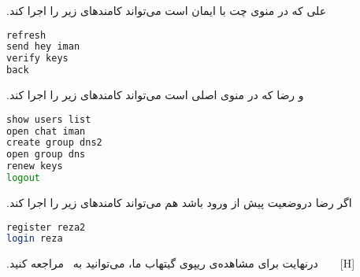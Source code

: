 ‫
‫علی که در منوی چت با ایمان است می‌تواند کامند‌های زیر را اجرا کند.
\begin{latin}
\begin{lstlisting}[firstnumber=1, language=bash]
refresh
send hey iman
verify keys
back
\end{lstlisting}
\end{latin}
‫
‫و رضا که در منوی اصلی است می‌تواند کامند‌های زیر را اجرا کند.
\begin{latin}
\begin{lstlisting}[firstnumber=1, language=bash]
show users list
open chat iman
create group dns2
open group dns
renew keys
logout
\end{lstlisting}
\end{latin}

‫اگر رضا دروضعیت پیش از ورود باشد هم می‌تواند کامند‌های زیر را اجرا کند.
\begin{latin}
\begin{lstlisting}[firstnumber=1, language=bash]
register reza2
login reza
\end{lstlisting}
\end{latin}

‫
‫[H]
‫
‫
‫
‫
‫
‫درنهایت برای مشاهده‌ی ریپوی گیتهاب ما، می‌توانید به~ مراجعه کنید.
‫